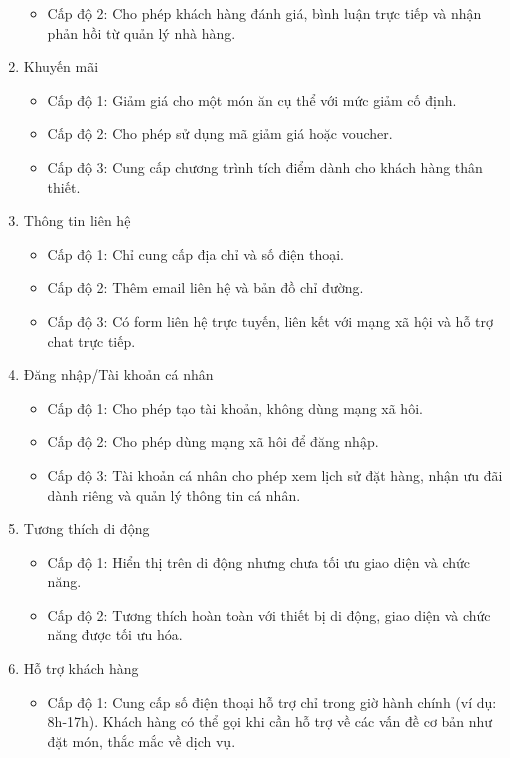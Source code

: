 \begin{enumerate}
\begin{itemize}
		      \item Cấp độ 2: Cho phép khách hàng đánh giá, bình luận trực tiếp và nhận phản hồi từ quản lý nhà hàng.
	      \end{itemize}
	\item Khuyến mãi
	      \begin{itemize}
		      \item Cấp độ 1: Giảm giá cho một món ăn cụ thể với mức giảm cố định.
		      \item Cấp độ 2: Cho phép sử dụng mã giảm giá hoặc voucher.
		      \item Cấp độ 3: Cung cấp chương trình tích điểm dành cho khách hàng thân thiết.
	      \end{itemize}
	\item Thông tin liên hệ
	      \begin{itemize}
		      \item Cấp độ 1: Chỉ cung cấp địa chỉ và số điện thoại.
		      \item Cấp độ 2: Thêm email liên hệ và bản đồ chỉ đường.
		      \item Cấp độ 3: Có form liên hệ trực tuyến, liên kết với mạng xã hội và hỗ trợ chat trực tiếp.
	      \end{itemize}
	\item Đăng nhập/Tài khoản cá nhân
	      \begin{itemize}
		      \item Cấp độ 1: Cho phép tạo tài khoản, không dùng mạng xã hôi.
		      \item Cấp độ 2: Cho phép dùng mạng xã hôi để đăng nhập.
		      \item Cấp độ 3: Tài khoản cá nhân cho phép xem lịch sử đặt hàng, nhận ưu đãi dành riêng và quản lý thông tin cá nhân.
	      \end{itemize}
	\item Tương thích di động
	      \begin{itemize}
		      \item Cấp độ 1: Hiển thị trên di động nhưng chưa tối ưu giao diện và chức năng.
		      \item Cấp độ 2: Tương thích hoàn toàn với thiết bị di động, giao diện và chức năng được tối ưu hóa.
	      \end{itemize}
	\item Hỗ trợ khách hàng
	      \begin{itemize}
		      \item Cấp độ 1: Cung cấp số điện thoại hỗ trợ chỉ trong giờ hành chính (ví dụ: 8h-17h). Khách hàng có thể gọi khi cần hỗ trợ về các vấn đề cơ bản như đặt món, thắc mắc về dịch vụ.

\end{itemize}
\end{enumerate}
